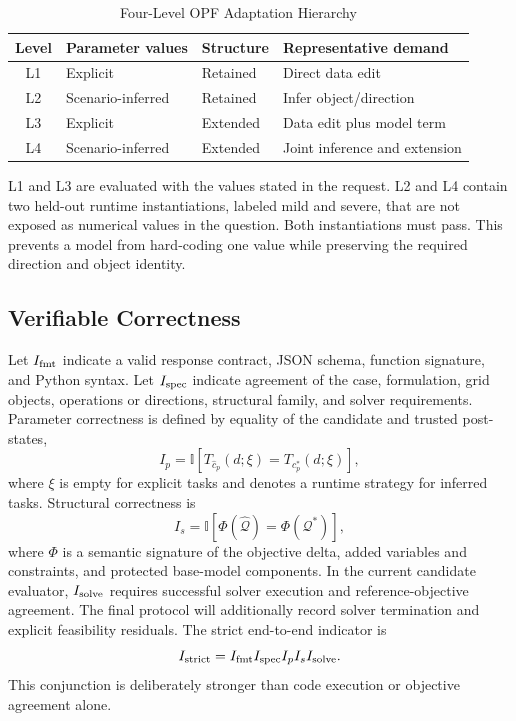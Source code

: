 \documentclass[lettersize,journal]{IEEEtran}
\begin{document}
\begin{table}[!t]
\caption{Four-Level OPF Adaptation Hierarchy}
\label{tab:levels}
\centering
\footnotesize
\renewcommand{\arraystretch}{1.08}
\begin{tabular}{@{}clll@{}}
\toprule
Level & Parameter values & Structure & Representative demand \\
\midrule
L1 & Explicit & Retained & Direct data edit \\
L2 & Scenario-inferred & Retained & Infer object/direction \\
L3 & Explicit & Extended & Data edit plus model term \\
L4 & Scenario-inferred & Extended & Joint inference and extension \\
\bottomrule
\end{tabular}
\end{table}

L1 and L3 are evaluated with the values stated in the request. L2 and L4 contain two held-out runtime instantiations, labeled mild and severe, that are not exposed as numerical values in the question. Both instantiations must pass. This prevents a model from hard-coding one value while preserving the required direction and object identity.

\subsection{Verifiable Correctness}
Let $I_{\rm fmt}$ indicate a valid response contract, JSON schema, function signature, and Python syntax. Let $I_{\rm spec}$ indicate agreement of the case, formulation, grid objects, operations or directions, structural family, and solver requirements. Parameter correctness is defined by equality of the candidate and trusted post-states,
\begin{equation}
I_p=\mathbb{I}\!\left[T_{\hat c_p}(d;\xi)=T_{c_p^*}(d;\xi)\right],
\end{equation}
where $\xi$ is empty for explicit tasks and denotes a runtime strategy for inferred tasks. Structural correctness is
\begin{equation}
I_s=\mathbb{I}\!\left[\Phi(\hat{\mathcal Q})=\Phi(\mathcal Q^*)\right],
\end{equation}
where $\Phi$ is a semantic signature of the objective delta, added variables and constraints, and protected base-model components. In the current candidate evaluator, $I_{\rm solve}$ requires successful solver execution and reference-objective agreement. The final protocol will additionally record solver termination and explicit feasibility residuals. The strict end-to-end indicator is
\begin{equation}\label{eq:strict}
I_{\rm strict}=I_{\rm fmt}I_{\rm spec}I_pI_sI_{\rm solve}.
\end{equation}
This conjunction is deliberately stronger than code execution or objective agreement alone.
\end{document}
